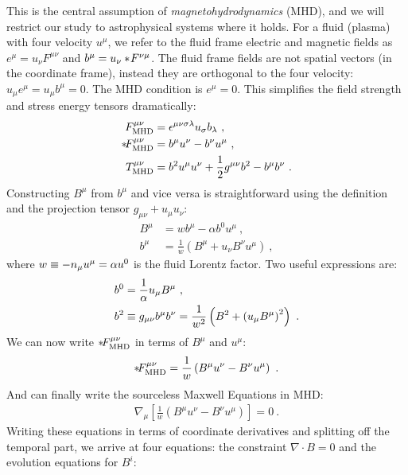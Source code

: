   This is the central assumption of \emph{magnetohydrodynamics} (MHD), and we will restrict our study to astrophysical systems where it holds.  For a fluid (plasma) with four velocity $u^\mu$, we refer to the fluid frame electric and magnetic fields as $e^\mu = u_\nu F^{\mu\nu}$ and $b^\mu = u_\nu*\! F^{\nu\mu}$. The fluid frame fields are not spatial vectors (in the coordinate frame), instead they are orthogonal to the four velocity: $u_\mu e^\mu = u_\mu b^\mu = 0$.  The MHD condition is $e^\mu = 0$.  This simplifies the field strength  and stress energy  tensors dramatically:
  \begin{align}
  	F^{\mu\nu}_{\text{MHD}} &= \eps^{\mu\nu\sig\lam}u_\sig b_\lam \ , \eqlabel{FMHD} \\
	\dualt{F}^{\mu\nu}_{\text{MHD}} &= b^\mu u^\nu - b^\nu u^\mu \ , \eqlabel{dFMHD} \\
  	T^{\mu\nu}_{\text{MHD}} &=  b^2 u^\mu u^\nu  + \frac{1}{2}g^{\mu\nu} b^2  - b^\mu b^\nu\ . \eqlabel{TMHD}
  \end{align}
    Constructing $B^\mu$ from $b^\mu$ and vice versa is straightforward using the definition  and the projection tensor $g_{\mu\nu} + u_\mu u_\nu$:
    \begin{align}
    	B^\mu &= w b^\mu - \alpha b^0 u^\mu \ , \\
	b^\mu &= \frac{1}{w}\left(B^\mu + u_\nu B^\nu u^\mu\right) \ ,
    \end{align}
    where $w \equiv -n_\mu u^\mu = \alpha u^0$ is the fluid Lorentz factor.  Two useful expressions are:
    \begin{align}
    	b^0 &= \frac{1}{\alpha} u_\mu B^\mu \ , \\
	b^2 &\equiv g_{\mu\nu} b^\mu b^\nu = \frac{1}{w^2}\left(B^2 + \left(u_\mu B^\mu\right)^2\right) \ .
    \end{align}
    We can now write $*\! F^{\mu\nu}_{\text{MHD}}$ in terms of $B^\mu$ and $u^\mu$:
    \begin{equation}
    	*\! F^{\mu\nu}_{\text{MHD}} = \frac{1}{w}\left(B^\mu u^\nu - B^\nu u^\mu\right) \ .
    \end{equation}
    And can finally write the sourceless Maxwell Equations  in MHD:
    \begin{align}
    	\nabla_\mu \left[\frac{1}{w}\left(B^\mu u^\nu - B^\nu u^\mu\right)\right] = 0\ .
    \end{align}
    Writing these equations in terms of coordinate derivatives and splitting off the temporal part, we arrive at four equations: the constraint $\nabla \cdot B = 0$ and the evolution equations for $B^i$:
